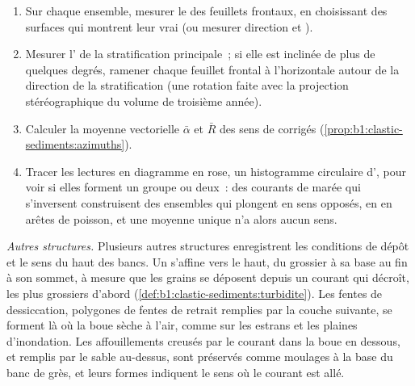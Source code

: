 \begin{method}\label{met:b1:clastic-sediments:palaeocurrent}
\begin{enumerate}
  \item Sur chaque ensemble, mesurer le  des feuillets frontaux, en choisissant
        des surfaces qui montrent leur vrai  (ou mesurer direction et ).
  \item Mesurer l' de la stratification principale~; si elle est inclinée de plus de
        quelques degrés, ramener chaque feuillet frontal à l'horizontale autour de la direction
        de la stratification (une rotation faite avec la projection stéréographique du volume de troisième année).
  \item Calculer la moyenne vectorielle $\bar\alpha$ et $\bar R$ des sens de 
        corrigés (\cref{prop:b1:clastic-sediments:azimuths}).
  \item Tracer les lectures en diagramme en rose, un histogramme circulaire d',
        pour voir si elles forment un groupe ou deux~: des courants de marée qui s'inversent
        construisent des ensembles qui plongent en sens opposés, en  en arêtes de poisson, et une moyenne unique n'a alors aucun sens.
\end{enumerate}
\end{method}

\emph{Autres structures.} Plusieurs autres structures enregistrent les conditions de
dépôt et le sens du haut des bancs. Un  s'affine vers le haut, du grossier à
sa base au fin à son sommet, à mesure que les grains se déposent depuis un courant qui décroît, les
plus grossiers d'abord (\cref{def:b1:clastic-sediments:turbidite}). Les fentes de
dessiccation, polygones de fentes de retrait remplies par la couche suivante, se forment là où la boue sèche à l'air,
comme sur les estrans et les plaines d'inondation. Les affouillements creusés par le courant dans la boue
en dessous, et remplis par le sable au-dessus, sont préservés comme moulages à la base du
banc de grès, et leurs formes indiquent le sens où le courant est allé.

